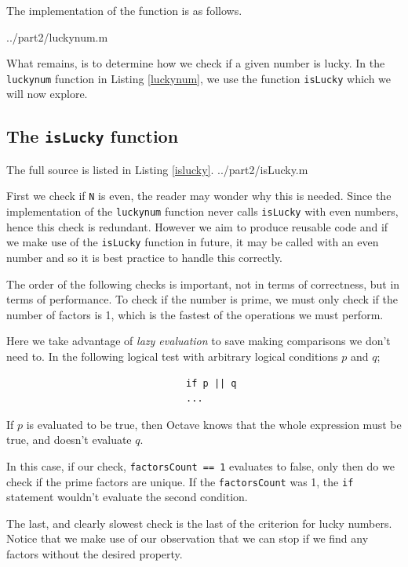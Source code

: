 \documentclass[10pt]{article}
\begin{document}
The implementation of the function is as follows. 

   {../part2/luckynum.m}

What remains, is to determine how we check if a given number is lucky. In the \texttt{luckynum} function in Listing \ref{luckynum}, we use the function \texttt{isLucky} which we will now explore.

  
\subsection{The \texttt{isLucky} function}

The full source is listed in Listing \ref{islucky}.
   {../part2/isLucky.m}
  
First we check if \texttt{N} is even, the reader may wonder why this is needed. Since the implementation of the \texttt{luckynum} function never calls \texttt{isLucky} with even numbers, hence this check is redundant. However we aim to produce reusable code and if we make use of the \texttt{isLucky} function in future, it may be called with an even number and so it is best practice to handle this correctly.

The order of the following checks is important, not in terms of correctness, but in terms of performance.  To check if the number is prime, we must only check if the number of factors is 1, which is the fastest of the operations we must perform.

Here we take advantage of \emph{lazy evaluation} to save making comparisons we don't need to. In the following logical test with arbitrary logical conditions $p$ and $q$;

\begin{verbatim}
                                if p || q
                                ...
\end{verbatim}

If $p$ is evaluated to be true, then Octave knows that the whole expression must be true, and doesn't evaluate $q$. 

In this case, if our check, \texttt{factorsCount == 1} evaluates to false, only then do we check if the prime factors are unique. If the \texttt{factorsCount} was 1, the \texttt{if} statement wouldn't evaluate the second condition.

The last, and clearly slowest check is the last  of the criterion for lucky numbers. Notice that we make use of our observation that we can stop if we find any factors without the desired property.
\end{document}
